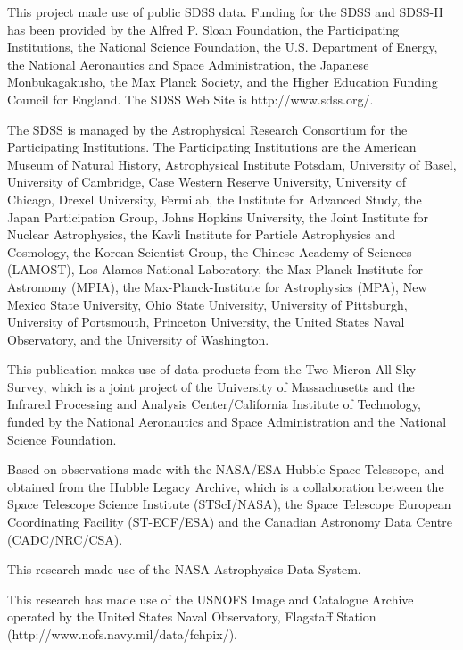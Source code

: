 This project made use of public SDSS data.  Funding for the SDSS and
SDSS-II has been provided by the Alfred P. Sloan Foundation, the
Participating Institutions, the National Science Foundation, the
U.S. Department of Energy, the National Aeronautics and Space
Administration, the Japanese Monbukagakusho, the Max Planck Society,
and the Higher Education Funding Council for England. The SDSS Web
Site is http://www.sdss.org/.

The SDSS is managed by the Astrophysical Research Consortium for the
Participating Institutions. The Participating Institutions are the
American Museum of Natural History, Astrophysical Institute Potsdam,
University of Basel, University of Cambridge, Case Western Reserve
University, University of Chicago, Drexel University, Fermilab, the
Institute for Advanced Study, the Japan Participation Group, Johns
Hopkins University, the Joint Institute for Nuclear Astrophysics, the
Kavli Institute for Particle Astrophysics and Cosmology, the Korean
Scientist Group, the Chinese Academy of Sciences (LAMOST), Los Alamos
National Laboratory, the Max-Planck-Institute for Astronomy (MPIA),
the Max-Planck-Institute for Astrophysics (MPA), New Mexico State
University, Ohio State University, University of Pittsburgh,
University of Portsmouth, Princeton University, the United States
Naval Observatory, and the University of Washington.

This publication makes use of data products from the Two Micron All
Sky Survey, which is a joint project of the University of
Massachusetts and the Infrared Processing and Analysis
Center/California Institute of Technology, funded by the National
Aeronautics and Space Administration and the National Science
Foundation.

Based on observations made with the NASA/ESA Hubble Space Telescope,
and obtained from the Hubble Legacy Archive, which is a collaboration
between the Space Telescope Science Institute (STScI/NASA), the Space
Telescope European Coordinating Facility (ST-ECF/ESA) and the Canadian
Astronomy Data Centre (CADC/NRC/CSA).

This research made use of the NASA Astrophysics Data System.


This research has made use of the USNOFS Image and Catalogue Archive
operated by the United States Naval Observatory, Flagstaff Station
\newline
(http://www.nofs.navy.mil/data/fchpix/).

